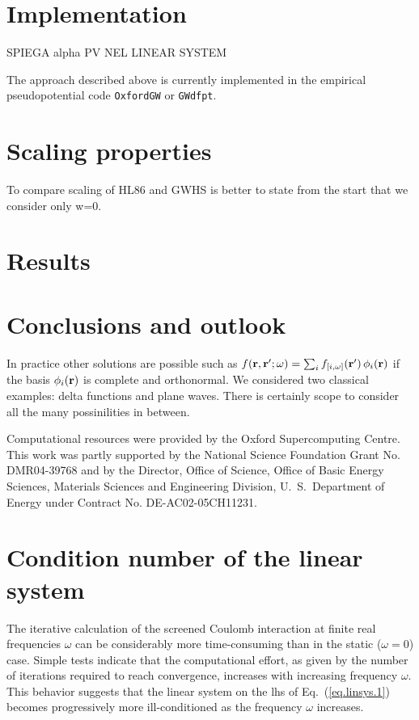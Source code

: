 \documentclass[twocolumn,prb,showpacs,superscriptaddress]{revtex4}
\def\w{\omega}
\def\r{{\bf r}}
\def\rp{{\bf r^\prime}}
\begin{document}
\section{Implementation}

SPIEGA alpha PV NEL LINEAR SYSTEM

The approach described above is currently implemented in the empirical
pseudopotential code {\tt OxfordGW} or {\tt GWdfpt}. 

\section{Scaling properties}

To compare scaling of HL86 and GWHS is better to state from the start that
we consider only w=0.

\section{Results}

\section{Conclusions and outlook}

In practice other solutions are possible such as $f(\r,\rp;\w) = \sum_i f_{[i,\w]}(\rp) \, \phi_i(\r)$
if the basis $\phi_i(\r)$ is complete and orthonormal. We considered two classical
examples: delta functions and plane waves. There is certainly scope to consider
all the many possinilities in between.

\begin{acknowledgments}
Computational resources were provided by the Oxford Supercomputing Centre.
This work was partly supported by the National Science Foundation Grant No. DMR04-39768 and by
the Director, Office of Science, Office of Basic Energy Sciences, Materials Sciences
and Engineering Division, U.\ S.\ Department of Energy under Contract No. DE-AC02-05CH11231.
\end{acknowledgments}

\appendix

\section{Condition number of the linear system}

The iterative calculation of the screened Coulomb interaction at finite real
frequencies $\w$ can be considerably more time-consuming than in the static
($\w=0$) case. Simple tests indicate that the computational effort, as given
by the number of iterations required to reach convergence, increases with 
increasing frequency $\w$. This behavior suggests that the linear system 
on the lhs of Eq.\ (\ref{eq.linsys.1}) becomes progressively more ill-conditioned 
as the frequency $\w$ increases.
\end{document}
